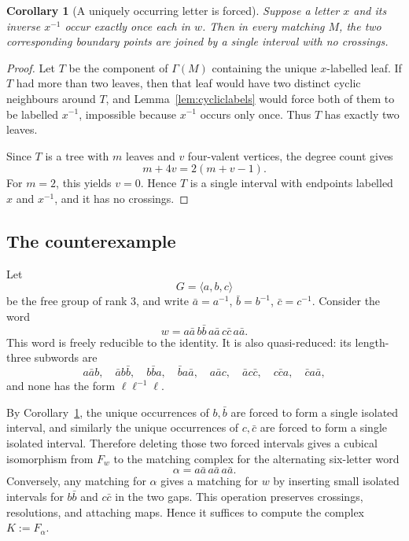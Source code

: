 \documentclass[12pt]{article}
\newtheorem{corollary}{Corollary}
\begin{document}
\begin{corollary}[A uniquely occurring letter is forced]\label{cor:forced}
Suppose a letter \(x\) and its inverse \(x^{-1}\) occur exactly once each in \(w\).  Then in every matching \(M\), the two corresponding boundary points are joined by a single interval with no crossings.
\end{corollary}

\begin{proof}
Let \(T\) be the component of \(\Gamma(M)\) containing the unique \(x\)-labelled leaf.  If \(T\) had more than two leaves, then that leaf would have two distinct cyclic neighbours around \(T\), and Lemma~\ref{lem:cycliclabels} would force both of them to be labelled \(x^{-1}\), impossible because \(x^{-1}\) occurs only once.  Thus \(T\) has exactly two leaves.

Since \(T\) is a tree with \(m\) leaves and \(v\) four-valent vertices, the degree count gives
\[
m+4v=2(m+v-1).
\]
For \(m=2\), this yields \(v=0\).  Hence \(T\) is a single interval with endpoints labelled \(x\) and \(x^{-1}\), and it has no crossings.
\end{proof}

\subsection{The counterexample}

Let
\[
G=\langle a,b,c\rangle
\]
be the free group of rank \(3\), and write \(\bar a=a^{-1}\), \(\bar b=b^{-1}\), \(\bar c=c^{-1}\).  Consider the word
\[
w=a\bar a\, b\bar b\, a\bar a\, c\bar c\, a\bar a.
\]
This word is freely reducible to the identity.  It is also quasi-reduced: its length-three subwords are
\[
a\bar a b,\quad
\bar a b\bar b,\quad
b\bar b a,\quad
\bar b a\bar a,\quad
a\bar a c,\quad
\bar a c\bar c,\quad
c\bar c a,\quad
\bar c a\bar a,
\]
and none has the form \(\ell\ell^{-1}\ell\).

By Corollary~\ref{cor:forced}, the unique occurrences of \(b,\bar b\) are forced to form a single isolated interval, and similarly the unique occurrences of \(c,\bar c\) are forced to form a single isolated interval.  Therefore deleting those two forced intervals gives a cubical isomorphism from \(F_w\) to the matching complex for the alternating six-letter word
\[
\alpha=a\bar a\, a\bar a\, a\bar a.
\]
Conversely, any matching for \(\alpha\) gives a matching for \(w\) by inserting small isolated intervals for \(b\bar b\) and \(c\bar c\) in the two gaps.  This operation preserves crossings, resolutions, and attaching maps.  Hence it suffices to compute the complex \(K:=F_\alpha\).
\end{document}
